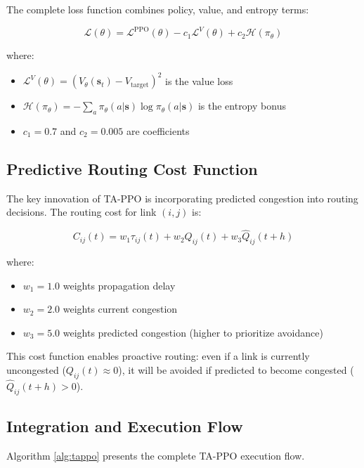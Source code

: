 The complete loss function combines policy, value, and entropy terms:

\begin{equation}
\mathcal{L}(\theta) = \mathcal{L}^{\text{PPO}}(\theta) - c_1 \mathcal{L}^V(\theta) + c_2 \mathcal{H}(\pi_\theta)
\end{equation}

where:
\begin{itemize}
\item $\mathcal{L}^V(\theta) = (V_\theta(\mathbf{s}_t) - V_{\text{target}})^2$ is the value loss
\item $\mathcal{H}(\pi_\theta) = -\sum_a \pi_\theta(a|\mathbf{s}) \log \pi_\theta(a|\mathbf{s})$ is the entropy bonus
\item $c_1 = 0.7$ and $c_2 = 0.005$ are coefficients
\end{itemize}

\subsection{Predictive Routing Cost Function}

The key innovation of TA-PPO is incorporating predicted congestion into routing decisions. The routing cost for link $(i,j)$ is:

\begin{equation}
C_{ij}(t) = w_1 \tau_{ij}(t) + w_2 Q_{ij}(t) + w_3 \hat{Q}_{ij}(t+h)
\end{equation}

where:
\begin{itemize}
\item $w_1 = 1.0$ weights propagation delay
\item $w_2 = 2.0$ weights current congestion
\item $w_3 = 5.0$ weights predicted congestion (higher to prioritize avoidance)
\end{itemize}

This cost function enables proactive routing: even if a link is currently uncongested ($Q_{ij}(t) \approx 0$), it will be avoided if predicted to become congested ($\hat{Q}_{ij}(t+h) > 0$).

\subsection{Integration and Execution Flow}

Algorithm \ref{alg:tappo} presents the complete TA-PPO execution flow.

